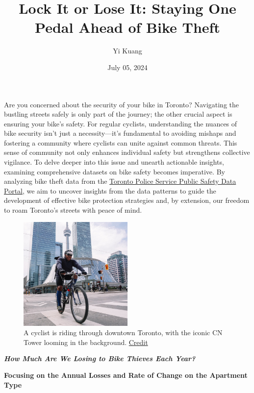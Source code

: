 \documentclass[
  11pt,
]{article}
\title{Lock It or Lose It: Staying One Pedal Ahead of Bike Theft}
\author{Yi Kuang}
\date{July 05, 2024}
\begin{document}
\maketitle

\setlength{\parindent}{1cm}

\indent Are you concerned about the security of your bike in Toronto?
Navigating the bustling streets safely is only part of the journey; the
other crucial aspect is ensuring your bike's safety. For regular
cyclists, understanding the nuances of bike security isn't just a
necessity---it's fundamental to avoiding mishaps and fostering a
community where cyclists can unite against common threats. This sense of
community not only enhances individual safety but strengthens collective
vigilance. To delve deeper into this issue and unearth actionable
insights, examining comprehensive datasets on bike safety becomes
imperative. By analyzing bike theft data from the
\href{https://data.torontopolice.on.ca/pages/bicycle-thefts}{Toronto
Police Service Public Safety Data Portal}, we aim to uncover insights
from the data patterns to guide the development of effective bike
protection strategies and, by extension, our freedom to roam Toronto's
streets with peace of mind.

\begin{figure}
  \centering
    \includegraphics[width=0.5\textwidth]{"toronto_bikee.jpeg"}
  \caption*{\hspace{0.5cm} A cyclist is riding through downtown Toronto, with the iconic CN Tower looming in the background. \href{https://condoinvestments.ca/toronto-condos-and-neighbourhoods-with-the-best-bike-score/}{Credit}}
\end{figure}

\textit{\textbf{{How Much Are We Losing to Bike Thieves Each Year?}}}

\textbf{\footnotesize{Focusing on the Annual Losses and Rate of Change on the Apartment Type}}
\end{document}
